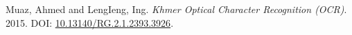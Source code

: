 \label{ch:references}

\begin{thebibliography}{99}

Muaz, Ahmed and LengIeng, Ing. 
\textit{Khmer Optical Character Recognition (OCR)}. 
2015. 
DOI: \href{https://doi.org/10.13140/RG.2.1.2393.3926}{10.13140/RG.2.1.2393.3926}.

\end{thebibliography}